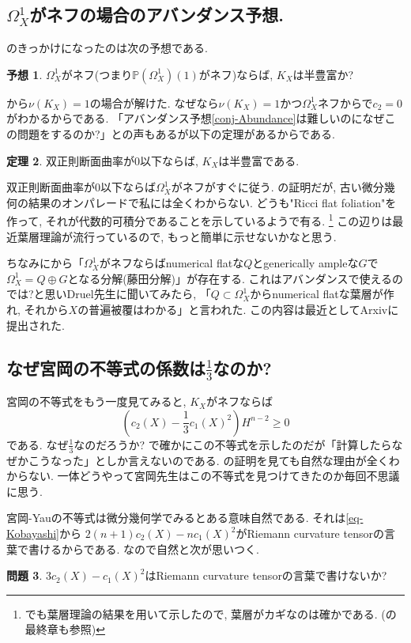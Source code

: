 \documentclass[dvipdfmx]{msjproc}
\theoremstyle{definition}
\newtheorem{thm}{定理}[section]
\newtheorem{conj}[thm]{予想}
\newtheorem{ques}[thm]{問題}
\begin{document}
\subsection{$\Omega_{X}^{1}$がネフの場合のアバンダンス予想. }
\cite{IM22}\cite{IMM24}のきっかけになったのは次の予想である.

\begin{conj}%
$\Omega_{X}^{1}$がネフ(つまり$\mathbb{P}(\Omega_{X}^1)(1)$がネフ)ならば, $K_X$は半豊富か?
\end{conj}
\cite{IM22}から$\nu(K_X) =1$の場合が解けた. なぜなら$\nu(K_X)=1$かつ$\Omega_{X}^{1}$ネフから\cite{DPS94}で$c_2=0$がわかるからである. 
「アバンダンス予想\ref{conj-Abundance}は難しいのになぜこの問題をするのか?」との声もあるが以下の定理があるからである.
\begin{thm}\cite{WZ02}
双正則断面曲率が$0$以下ならば, $K_X$は半豊富である.
\end{thm}
双正則断面曲率が$0$以下ならば$\Omega_{X}^{1}$がネフがすぐに従う. 
\cite{WZ02}の証明だが, 古い微分幾何の結果のオンパレードで私には全くわからない. 
どうも"Ricci flat foliation"を作って, それが代数的可積分であることを示しているようで有る. \footnote{\cite{IM22}でも葉層理論の結果を用いて示したので, 葉層がカギなのは確かである. (\cite{GonSur}の最終章も参照)}
この辺りは最近葉層理論が流行っているので, もっと簡単に示せないかなと思う. 

ちなみに\cite{IM22}から「$\Omega_{X}^{1}$がネフならばnumerical flatな$Q$とgenerically ampleな$G$で$\Omega_{X}^{1} = Q \oplus G$となる分解(藤田分解)」が存在する.
これはアバンダンスで使えるのでは?と思いDruel先生に聞いてみたら, 「$Q \subset \Omega_{X}^{1}$からnumerical flatな葉層が作れ, それから$X$の普遍被覆はわかる」と言われた. この内容は最近\cite{DPPT24}としてArxivに提出された. 

\subsection{なぜ宮岡の不等式の係数は$\frac{1}{3}$なのか?}

宮岡の不等式をもう一度見てみると, $K_X$がネフならば
$$
\left(c_2(X) - \frac{1}{3}c_1(X)^2 \right) H^{n-2} \ge0
$$
である. なぜ$\frac{1}{3}$なのだろうか?
\cite{IMM24}で確かにこの不等式を示したのだが「計算したらなぜかこうなった」としか言えないのである. 
\cite{Miy87}の証明を見ても自然な理由が全くわからない.
一体どうやって宮岡先生はこの不等式を見つけてきたのか毎回不思議に思う. 

宮岡-Yauの不等式は微分幾何学でみるとある意味自然である. それは\eqref{eq-Kobayashi}から
$2(n+1)c_2(X) - n c_{1}(X)^{2}$がRiemann curvature tensorの言葉で書けるからである. 
なので自然と次が思いつく.
\begin{ques}
$3c_2(X) -  c_{1}(X)^{2}$はRiemann curvature tensorの言葉で書けないか?
\end{ques}
\end{document}
